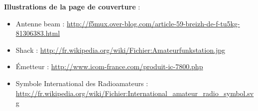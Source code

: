 \documentclass[a4paper,12pt,oneside]{report} %
\begin{document}
	\noindent\textbf{Illustrations de la page de couverture} :
	
	\begin{itemize}
		\item Antenne beam : \url{http://f5mux.over-blog.com/article-59-breizh-de-f-tu5kg-81306383.html}
	
		\item Shack : \url{http://fr.wikipedia.org/wiki/Fichier:Amateurfunkstation.jpg}
	
		\item Émetteur : \url{http://www.icom-france.com/produit-ic-7800.php}
	
		\item Symbole International des Radioamateurs : \url{http://fr.wikipedia.org/wiki/Fichier:International_amateur_radio_symbol.svg}
	\end{itemize}
	
	
	
			
	
\end{document}
